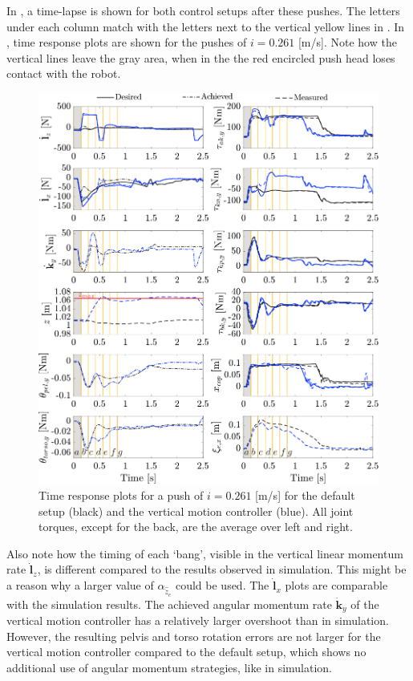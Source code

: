 In , a time-lapse is shown for both control setups after these pushes. The letters under each column match with the letters next to the vertical yellow lines in . In , time response plots are shown for the pushes of $i=0.261$ [m/s]. Note how the vertical lines leave the gray area, when in the  the red encircled push head loses contact with the robot. 
\begin{figure}
\centering
\includegraphics[width=1.0\textwidth]{STYLESTUFF/valcomparetimeHW.png}
\caption{Time response plots for a push of $i=0.261$ [m/s] for the default setup (black) and the vertical motion controller (blue). All joint torques, except for the back, are the average over left and right.}
\label{fig:valcomparetimeHW}
\end{figure}

Also note how the timing of each `bang', visible in the vertical linear momentum rate $\dot{\mathbf{l}}_z$, is different compared to the results observed in simulation. This might be a reason why a larger value of $\alpha_{\hat{\ddot{z}}_{c}}$ could be used. The $\dot{\mathbf{l}}_x$ plots are comparable with the simulation results. The achieved angular momentum rate $\dot{\mathbf{k}}_y$ of the vertical motion controller has a relatively larger overshoot than in simulation. However, the resulting pelvis and torso rotation errors are not larger for the vertical motion controller compared to the default setup, which shows no additional use of angular momentum strategies, like in simulation. 

